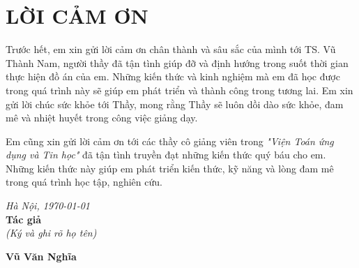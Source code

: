 \newpage

\chapter*{\centering LỜI CẢM ƠN}


Trước hết, em xin gửi lời cảm ơn chân thành và sâu sắc của mình tới TS. Vũ Thành Nam, người thầy đã tận tình giúp đỡ và định hướng trong suốt thời gian thực hiện đồ án của em. Những kiến thức và kinh nghiệm mà em đã học được trong quá trình này sẽ giúp em phát triển và thành công trong tương lai. Em xin gửi lời chúc sức khỏe tới Thầy, mong rằng Thầy sẽ luôn dồi dào sức khỏe, đam mê và nhiệt huyết trong công việc giảng dạy.

Em cũng xin gửi lời cảm ơn tới các thầy cô giảng viên trong \textit{"Viện Toán ứng dụng và Tin học"} đã tận tình truyền đạt những kiến thức quý báu cho em. Những kiến thức này giúp em phát triển kiến thức, kỹ năng và lòng đam mê trong quá trình học tập, nghiên cứu.

\vspace{0.7cm}

\hspace{0.4\textwidth}\begin{minipage}{0.5\textwidth}

\noindent\begin{center}

\textit{Hà Nội, \today} \\

\textbf{Tác giả} \\

\textit{(Ký và ghi rõ họ tên)}

\vspace{2cm}

\textbf{Vũ Văn Nghĩa}

\end{center}

\end{minipage}

\newpage

